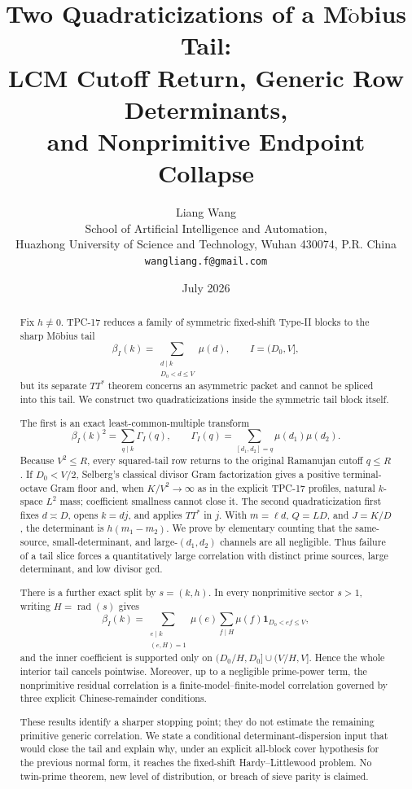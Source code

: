 \documentclass[11pt]{article}
\title{\textbf{Two Quadraticizations of a M\texorpdfstring{$\ddot{\mathrm{o}}$}{o}bius Tail:}\\
\textbf{LCM Cutoff Return, Generic Row Determinants,}\\
\textbf{and Nonprimitive Endpoint Collapse}}
\author{Liang Wang\\
\small School of Artificial Intelligence and Automation,\\[-0.2em]
\small Huazhong University of Science and Technology, Wuhan 430074, P.R. China\\
\small \texttt{wangliang.f@gmail.com}}
\date{July 2026}
\theoremstyle{definition}
\theoremstyle{remark}
\newcommand{\one}{\mathbf 1}
\newcommand{\rad}{\operatorname{rad}}
\begin{document}
\maketitle

\begin{abstract}
Fix $h\ne0$.  TPC-17 reduces a family of symmetric fixed-shift
Type-II blocks to the sharp M\"obius tail
\[
 \beta_I(k)=\sum_{\substack{d\mid k\\D_0<d\le V}}\mu(d),
 \qquad I=(D_0,V],
\]
but its separate $TT^*$ theorem concerns an asymmetric packet and
cannot be spliced into this tail.  We construct two quadraticizations
inside the symmetric tail block itself.

The first is an exact least-common-multiple transform
\[
 \beta_I(k)^2=\sum_{q\mid k}\Gamma_I(q),
 \qquad
 \Gamma_I(q)=\sum_{[d_1,d_2]=q}\mu(d_1)\mu(d_2).
\]
Because $V^2\le R$, every squared-tail row returns to the original
Ramanujan cutoff $q\le R$.  If $D_0<V/2$, Selberg's classical divisor
Gram factorization gives a positive terminal-octave Gram floor and, when
$K/V^2\to\infty$ as in the explicit TPC-17 profiles, natural
$k$-space $L^2$ mass; coefficient smallness cannot close it.  The second
quadraticization first fixes $d\asymp D$, opens $k=dj$, and applies
$TT^*$ in $j$.  With $m=\ell d$, $Q=LD$, and $J=K/D$, the determinant
is $h(m_1-m_2)$.  We prove by elementary counting that the same-source,
small-determinant, and large-$(d_1,d_2)$ channels are all negligible.
Thus failure of a tail slice forces a quantitatively large correlation
with distinct prime sources, large determinant, and low divisor gcd.

There is a further exact split by $s=(k,h)$.  In every nonprimitive
sector $s>1$, writing $H=\rad(s)$ gives
\[
 \beta_I(k)=\sum_{\substack{e\mid k\\(e,H)=1}}\mu(e)
 \sum_{f\mid H}\mu(f)\one_{D_0<ef\le V},
\]
and the inner coefficient is supported only on
$(D_0/H,D_0]\cup(V/H,V]$.  Hence the whole interior tail cancels
pointwise.  Moreover, up to a negligible prime-power term, the
nonprimitive residual correlation is a finite-model--finite-model
correlation governed by three explicit Chinese-remainder conditions.

These results identify a sharper stopping point; they do not estimate
the remaining primitive generic correlation.  We state a conditional
determinant-dispersion input that would close the tail and explain why,
under an explicit all-block cover hypothesis for the previous normal form, it reaches
the fixed-shift Hardy--Littlewood problem.  No twin-prime theorem, new
level of distribution, or breach of sieve parity is claimed.
\end{abstract}
\end{document}
